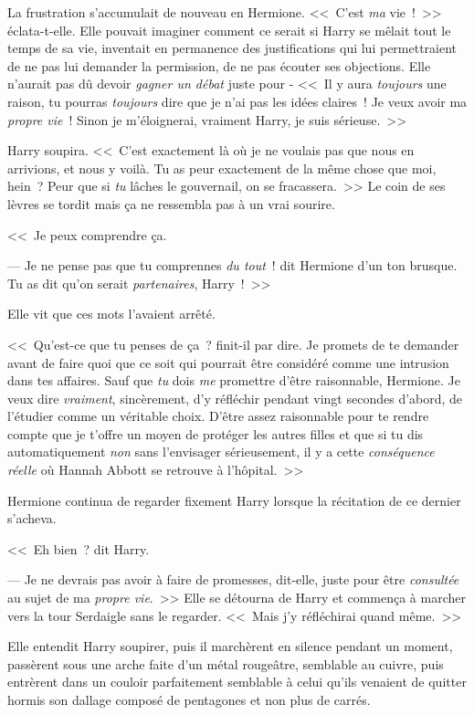 La frustration s'accumulait de nouveau en Hermione. <<~C'est \emph{ma} vie~!~>> éclata-t-elle. Elle pouvait imaginer comment ce serait si Harry se mêlait tout le temps de sa vie, inventait en permanence des justifications qui lui permettraient de ne pas lui demander la permission, de ne pas écouter ses objections. Elle n'aurait pas dû devoir \emph{gagner un débat} juste pour - <<~Il y aura \emph{toujours} une raison, tu pourras \emph{toujours} dire que je n'ai pas les idées claires~! Je veux avoir ma \emph{propre vie}~! Sinon je m'éloignerai, vraiment Harry, je suis sérieuse.~>>

Harry soupira. <<~C'est exactement là où je ne voulais pas que nous en arrivions, et nous y voilà. Tu as peur exactement de la même chose que moi, hein~? Peur que si \emph{tu} lâches le gouvernail, on se fracassera.~>> Le coin de ses lèvres se tordit mais ça ne ressembla pas à un vrai sourire.

<<~Je peux comprendre ça.

--- Je ne pense pas que tu comprennes \emph{du tout}~! dit Hermione d'un ton brusque. Tu as dit qu'on serait \emph{partenaires}, Harry~!~>>

Elle vit que ces mots l'avaient arrêté.

<<~Qu'est-ce que tu penses de ça~? finit-il par dire. Je promets de te demander avant de faire quoi que ce soit qui pourrait être considéré comme une intrusion dans tes affaires. Sauf que \emph{tu} dois \emph{me} promettre d'être raisonnable, Hermione. Je veux dire \emph{vraiment}, sincèrement, d'y réfléchir pendant vingt secondes d'abord, de l'étudier comme un véritable choix. D'être assez raisonnable pour te rendre compte que je t'offre un moyen de protéger les autres filles et que si tu dis automatiquement \emph{non} sans l'envisager sérieusement, il y a cette \emph{conséquence réelle} où Hannah Abbott se retrouve à l'hôpital.~>>

Hermione continua de regarder fixement Harry lorsque la récitation de ce dernier s'acheva.

<<~Eh bien~? dit Harry.

--- Je ne devrais pas avoir à faire de promesses, dit-elle, juste pour être \emph{consultée} au sujet de ma \emph{propre vie}.~>> Elle se détourna de Harry et commença à marcher vers la tour Serdaigle sans le regarder. <<~Mais j'y réfléchirai quand même.~>>

Elle entendit Harry soupirer, puis il marchèrent en silence pendant un moment, passèrent sous une arche faite d'un métal rougeâtre, semblable au cuivre, puis entrèrent dans un couloir parfaitement semblable à celui qu'ils venaient de quitter hormis son dallage composé de pentagones et non plus de carrés.


